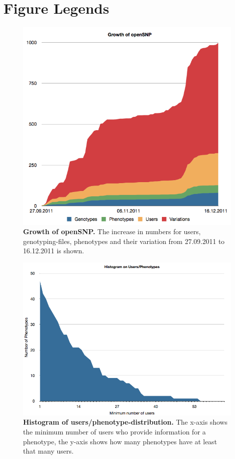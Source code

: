 \documentclass[10pt]{article}
\begin{document}
\section*{Figure Legends}
\begin{figure}[!ht]
	\begin{center}
		\includegraphics[scale=0.35]{chart_growth.png}
	\end{center}
	\caption{
	{\bf Growth of openSNP.} The increase in numbers for users, genotyping-files, phenotypes and their variation from 27.09.2011 to 16.12.2011 is shown.} 
	\label{Figure1_label}
\end{figure}

\begin{figure}[!ht]
	\begin{center}
		\includegraphics[scale=0.40]{histogram_phenotypes.png}
	\end{center}
	\caption{
	{\bf Histogram of users/phenotype-distribution.} The x-axis shows the minimum number of users who provide information for a phenotype, the y-axis shows how many phenotypes have at least that many users.}
	\label{Figure2_label}
\end{figure}
\end{document}

